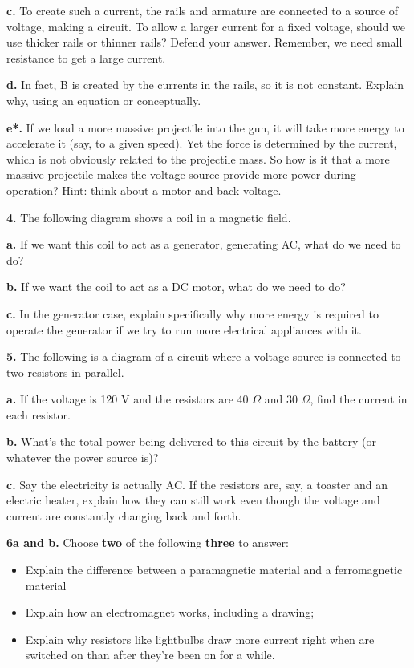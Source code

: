 \documentclass[12pt]{article}
\begin{document}
\textbf{c.} To create such a current, the rails and armature are connected to a source of voltage, making a circuit. To allow a larger current for a fixed voltage, should we use thicker rails or thinner rails? Defend your answer. Remember, we need small resistance to get a large current.


\textbf{d.} In fact, B is created by the currents in the rails, so it is not constant. Explain why, using an equation or conceptually.

\textbf{e*.} If we load a more massive projectile into the gun, it will take more energy to accelerate it (say, to a given speed). Yet the force is determined by the current, which is not obviously related to the projectile mass. So how is it that a more massive projectile makes the voltage source provide more power during operation? Hint: think about a motor and back voltage.

\newpage

\textbf{4.} The following diagram shows a coil in a magnetic field.

\vspace{2cm}

\textbf{a.} If we want this coil to act as a generator, generating AC, what do we need to do?

\textbf{b.} If we want the coil to act as a DC motor, what do we need to do?

\textbf{c.} In the generator case, explain specifically why more energy is required to operate the generator if we try to run more electrical appliances with it. 

\bigskip

\textbf{5.} The following is a diagram of a circuit where a voltage source is connected to two resistors in parallel. 

\vspace{2.2cm}

\textbf{a.} If the voltage is 120 V and the resistors are 40 $\Omega$ and 30 $\Omega$, find the current in each resistor.

\textbf{b.} What's the total power being delivered to this circuit by the battery (or whatever the power source is)?

\textbf{c.} Say the electricity is actually AC. If the resistors are, say, a toaster and an electric heater, explain how they can still work even though the voltage and current are constantly changing back and forth. 

\bigskip

\textbf{6a and b.} Choose \textbf{two} of the following \textbf{three} to answer: 
\begin{itemize}
    \item Explain the difference between a paramagnetic material and a ferromagnetic material
    \item Explain how an electromagnet works, including a drawing; 
    \item Explain why resistors like lightbulbs draw more current right when are switched on than after they're been on for a while.
\end{itemize}
\end{document}
